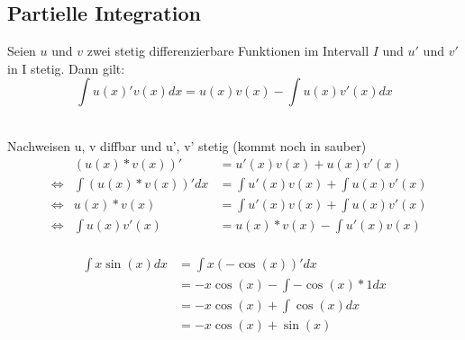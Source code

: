 \subsection{Partielle Integration}
\begin{Theorem}
  Seien $u$ und $v$ zwei stetig differenzierbare Funktionen im Intervall $I$ und $u'$
  und $v'$ in I stetig. Dann gilt:
  $$\int u(x)'v(x) dx= u(x)v(x) - \int u(x)v'(x) dx$$
\end{Theorem}
\begin{Beweis}\\
Nachweisen u, v diffbar und u', v' stetig (kommt noch in sauber)\\
\begin{align*}
  &&(u(x)*v(x))' &= u'(x)v(x)+u(x)v'(x)\\
  &\Leftrightarrow & \int (u(x)*v(x))' dx &= \int u'(x)v(x)+\int u(x)v'(x)\\
  &\Leftrightarrow & u(x)*v(x) &= \int u'(x)v(x)+\int u(x)v'(x)\\
  &\Leftrightarrow & \int u(x)v'(x) &= u(x)*v(x)- \int u'(x)v(x)\\
\end{align*}
\end{Beweis}
\begin{Beispiel}
  \begin{align*}
  \int x\sin(x) dx &= \int x(-\cos(x))' dx\\
  &= -x\cos(x) - \int-\cos(x)*1 dx\\
  &= -x\cos(x) + \int\cos(x) dx\\
  &= -x\cos(x) + \sin(x)
\end{align*}
\end{Beispiel}

